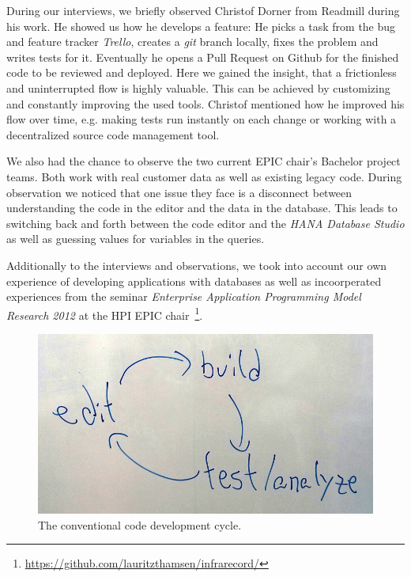 
During our interviews, we briefly observed Christof Dorner from Readmill during his work. He showed us how he develops a feature: He picks a task from the bug and feature tracker \emph{Trello}, creates a \emph{git} branch locally, fixes the problem and writes tests for it. Eventually he opens a Pull Request on Github for the finished code to be reviewed and deployed. Here we gained the insight, that a frictionless and uninterrupted flow is highly valuable. This can be achieved by customizing and constantly improving the used tools. Christof mentioned how he improved his flow over time, e.g. making tests run instantly on each change or working with a decentralized source code management tool.

We also had the chance to observe the two current EPIC chair's Bachelor project teams. Both work with real customer data as well as existing legacy code. During observation we noticed that one issue they face is a disconnect between understanding the code in the editor and the data in the database. This leads to switching back and forth between the code editor and the \emph{HANA Database Studio} as well as guessing values for variables in the queries.

Additionally to the interviews and observations, we took into account our own experience of developing applications with databases as well as incoorperated experiences from the seminar \emph{Enterprise Application Programming Model Research 2012} at the HPI EPIC chair~\footnote{\url{https://github.com/lauritzthamsen/infrarecord/}}.

\begin{figure}
    \includegraphics[width=\linewidth]{images/EditBuildTest.jpg}
    \caption{The conventional code development cycle.}
    \label{fig:cycle}
\end{figure}

